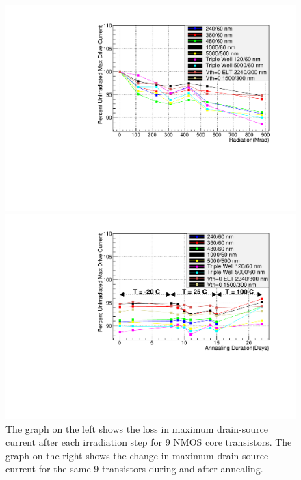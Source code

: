 \begin{figure}
\begin{minipage}[b]{0.5\textwidth}
	\centering
	\includegraphics[width=\linewidth]{Comparing_MaxCurrentDrive_NMOS_paper.pdf}
\end{minipage}
\hspace{0.5cm}
\begin{minipage}[b]{0.5\textwidth}
	\centering
	\includegraphics[width=\linewidth]{Comparing_MaxCurDrive_Anneal_NMOS_paper.pdf}
\end{minipage}
\caption{The graph on the left shows the loss in maximum drain-source current after each irradiation step for 9 NMOS core transistors. The graph on the right shows the change in maximum drain-source current for the same 9 transistors during and after annealing.}
\label{fig:MaxCurDrive_NMOS}
\end{figure}

